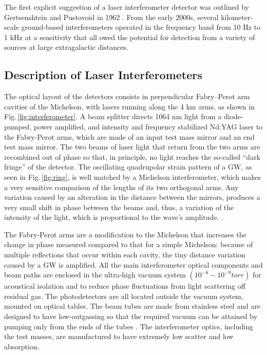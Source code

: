 \documentclass[binding=0.6cm, LaM]{sapthesis}
\begin{document}
	The first explicit suggestion of a laser interferometer detector 
	was outlined by Gertsenshtein and Pustovoid in 1962 \cite{8}.
	From the early 2000s, several kilometer-scale ground-based interferometers 
	operated in the frequency band from 10 Hz to 1 kHz at a sensitivity 
	that all owed the potential for detection from a variety 
	of sources at large extragalactic distances.

\subsection{Description of Laser Interferometers}

	The optical layout of the detectors consists in perpendicular 
	Fabry–Perot arm cavities of the Michelson, 
	with lasers running along the 4 km arms, as shown in Fig.\,\ref{fig:interferometer}. 
	A beam splitter directs 1064 nm light from a diode-pumped, power amplified, 
	and intensity and frequency stabilized Nd:YAG laser to the Fabry-Perot arms, 
	which are made of an input test mass mirror and an end test mass mirror. 
	The two beams of laser light that return from the two arms are recombined out of phase so that, 
	in principle, no light reaches the so-called ``dark fringe'' of the detector. 
	The oscillating quadrupolar strain pattern of a GW, 
	as seen in Fig.\,\ref{fig:ring}, is well matched by a Michelson interferometer,
        which makes a very sensitive comparison of the lengths of its two orthogonal arms.
	Any variation caused by an alteration in the distance between the mirrors, 
	produces a very small shift in phase between the beams and, thus, 
	a variation of the intensity of the light, which is proportional to the wave's amplitude. \cite{10}.

	The Fabry-Perot arms are a modification to the Michelson 
	that increases the change in phase measured compared to that for a simple Michelson: 
	because of multiple reflections that occur within each cavity, 
	the tiny distance variation caused by a GW is amplified. 
	All the main interferometer optical components and beam paths are enclosed in the ultra-high vacuum system
        $(10^{−8} - 10^{−9} torr)$ for acoustical isolation and to reduce phase fluctuations from light scattering off residual gas.
        The photodetectors are all located outside the vacuum system, mounted on optical tables.
        The beam tubes are made from stainless steel and are designed to have low-outgassing
        so that the required vacuum can be attained by pumping only from the ends of the tubes \cite{11}. 
        The interferometer optics, including the test masses, are manufactured to have extremely low scatter and low absorption.
\end{document}

